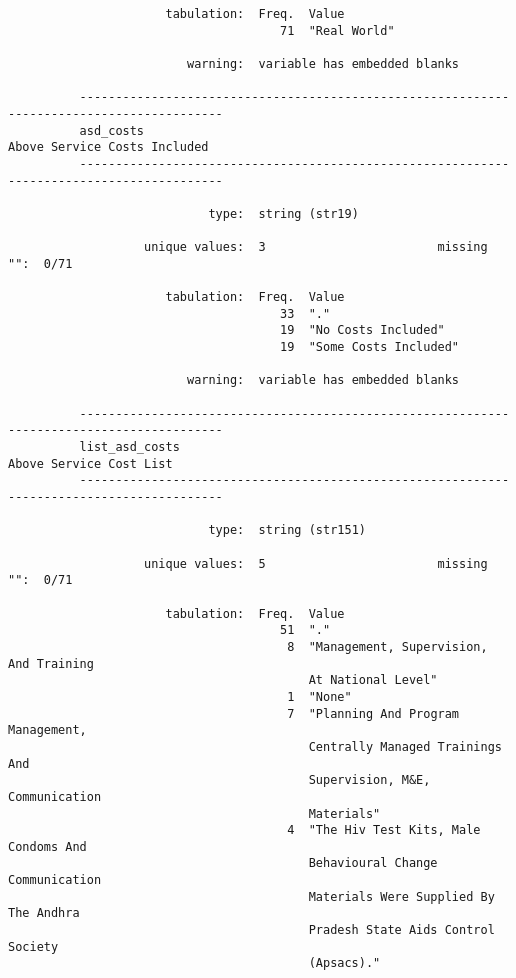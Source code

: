 \documentclass{article}
\begin{document}
\begin{verbatim}
                      tabulation:  Freq.  Value
                                      71  "Real World"
          
                         warning:  variable has embedded blanks
          
          ------------------------------------------------------------------------------------------
          asd_costs                                                     Above Service Costs Included
          ------------------------------------------------------------------------------------------
          
                            type:  string (str19)
          
                   unique values:  3                        missing "":  0/71
          
                      tabulation:  Freq.  Value
                                      33  "."
                                      19  "No Costs Included"
                                      19  "Some Costs Included"
          
                         warning:  variable has embedded blanks
          
          ------------------------------------------------------------------------------------------
          list_asd_costs                                                     Above Service Cost List
          ------------------------------------------------------------------------------------------
          
                            type:  string (str151)
          
                   unique values:  5                        missing "":  0/71
          
                      tabulation:  Freq.  Value
                                      51  "."
                                       8  "Management, Supervision, And Training
                                          At National Level"
                                       1  "None"
                                       7  "Planning And Program Management,
                                          Centrally Managed Trainings And
                                          Supervision, M&E, Communication
                                          Materials"
                                       4  "The Hiv Test Kits, Male Condoms And
                                          Behavioural Change Communication
                                          Materials Were Supplied By The Andhra
                                          Pradesh State Aids Control Society
                                          (Apsacs)."
          

\end{verbatim}
\end{document}
